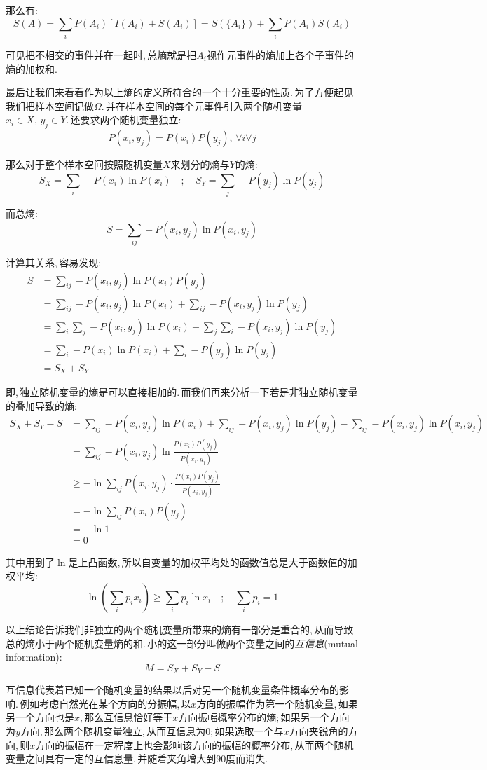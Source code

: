 那么有:
\[S(A)=\sum_i P(A_i)[I(A_i)+S(A_i)]=S(\{A_i\})+\sum_i P(A_i)S(A_i)\]

可见把不相交的事件并在一起时,\,总熵就是把\(A_i\)视作元事件的熵加上各个子事件的熵的加权和.

最后让我们来看看作为以上熵的定义所符合的一个十分重要的性质.\,为了方便起见我们把样本空间记做$\Omega$.\,并在样本空间的每个元事件引入两个随机变量$x_i\in X,\,y_j\in Y$.\,还要求两个随机变量独立:
\[P(x_i,y_j)=P(x_i)P(y_j),\,\forall i\forall j\]

那么对于整个样本空间按照随机变量$X$来划分的熵与$Y$的熵:
\[S_X=\sum_i -P(x_i)\ln P(x_i)\quad ;\quad S_Y=\sum_j -P(y_j)\ln P(y_j)\]

而总熵:
\[S=\sum_{ij}-P(x_i,y_j)\ln P(x_i,y_j)\]

计算其关系,\,容易发现:
\begin{align*}
S &=\sum_{ij}-P(x_i,y_j)\ln P(x_i)P(y_j)\\
  &=\sum_{ij}-P(x_i,y_j)\ln P(x_i)+\sum_{ij}-P(x_i,y_j)\ln P(y_j)\\
  &=\sum_{i}\sum_{j}-P(x_i,y_j)\ln P(x_i)+\sum_{j}\sum_{i}-P(x_i,y_j)\ln P(y_j)\\
  &=\sum_i -P(x_i)\ln P(x_i)+\sum_i -P(y_j)\ln P(y_j)\\
  &=S_X+S_Y
\end{align*}

即,\,独立随机变量的熵是可以直接相加的.\,而我们再来分析一下若是非独立随机变量的叠加导致的熵:
\begin{align*}
S_X+S_Y-S &=\sum_{ij}-P(x_i,y_j)\ln P(x_i)+\sum_{ij}-P(x_i,y_j)\ln P(y_j)-\sum_{ij}-P(x_i,y_j)\ln P(x_i,y_j)\\
	      &=\sum_{ij}-P(x_i,y_j)\ln\frac{P(x_i)P(y_j)}{P(x_i,y_j)}\\
	      &\geqslant -\ln\sum_{ij}P(x_i,y_j)\cdot\frac{P(x_i)P(y_j)}{P(x_i,y_j)}\\
	      &=-\ln\sum_{ij}P(x_i)P(y_j)\\
	      &=-\ln 1\\
	      &=0
\end{align*}


其中用到了$\ln$是上凸函数,\,所以自变量的加权平均处的函数值总是大于函数值的加权平均:
\[\ln(\sum_i p_ix_i)\geqslant \sum_ip_i\ln x_i\quad ; \quad \sum_ip_i=1\]

以上结论告诉我们非独立的两个随机变量所带来的熵有一部分是重合的,\,从而导致总的熵小于两个随机变量熵的和.\,小的这一部分叫做两个变量之间的\emph{互信息}(mutual information):
\[M=S_X+S_Y-S\]

互信息代表着已知一个随机变量的结果以后对另一个随机变量条件概率分布的影响.\,例如考虑自然光在某个方向的分振幅,\,以$x$方向的振幅作为第一个随机变量,\,如果另一个方向也是$x$,\,那么互信息恰好等于$x$方向振幅概率分布的熵;\,如果另一个方向为$y$方向,\,那么两个随机变量独立,\,从而互信息为$0$;\,如果选取一个与$x$方向夹锐角的方向,\,则$x$方向的振幅在一定程度上也会影响该方向的振幅的概率分布,\,从而两个随机变量之间具有一定的互信息量,\,并随着夹角增大到$90$度而消失.


